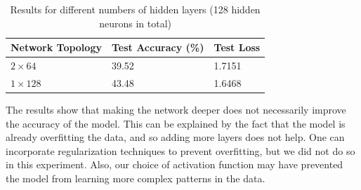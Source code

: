 \documentclass{article}
\begin{document}

    \begin{table}[H]
        \centering
        \caption{Results for different numbers of hidden layers (128 hidden neurons in total)}
        \label{tab:table3}
        \begin{tabular}{l|l|l}
            \toprule
            Network Topology & Test Accuracy (\%) & Test Loss \\
            \midrule
            $2 \times 64$    & 39.52              & 1.7151    \\
            $1 \times 128$   & 43.48              & 1.6468    \\
            \bottomrule
        \end{tabular}
    \end{table}

    The results show that making the network deeper does not necessarily improve the accuracy of the model.
    This can be explained by the fact that the model is already overfitting the data, and so adding more layers does not help.
    One can incorporate regularization techniques to prevent overfitting, but we did not do so in this experiment.
    Also, our choice of activation function may have prevented the model from learning more complex patterns in the data.
\end{document}
